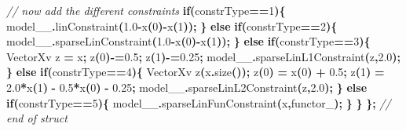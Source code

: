\documentclass[
]{book}
\newenvironment{Shaded}{\begin{snugshade}}{\end{snugshade}}
\newcommand{\CommentTok}[1]{\textcolor[rgb]{0.56,0.35,0.01}{\textit{#1}}}
\newcommand{\ControlFlowTok}[1]{\textcolor[rgb]{0.13,0.29,0.53}{\textbf{#1}}}
\newcommand{\DecValTok}[1]{\textcolor[rgb]{0.00,0.00,0.81}{#1}}
\newcommand{\FloatTok}[1]{\textcolor[rgb]{0.00,0.00,0.81}{#1}}
\newcommand{\NormalTok}[1]{#1}
\newcommand{\OperatorTok}[1]{\textcolor[rgb]{0.81,0.36,0.00}{\textbf{#1}}}
\newcommand{\VariableTok}[1]{\textcolor[rgb]{0.00,0.00,0.00}{#1}}
\begin{document}
\begin{Shaded}
\begin{Highlighting}[]
    \CommentTok{// now add the different constraints}
    \ControlFlowTok{if}\OperatorTok{(}\NormalTok{constrType}\OperatorTok{==}\DecValTok{1}\OperatorTok{)\{}
\NormalTok{      model\_\_}\OperatorTok{.}\NormalTok{linConstraint}\OperatorTok{(}\FloatTok{1.0}\OperatorTok{{-}}\NormalTok{x}\OperatorTok{(}\DecValTok{0}\OperatorTok{){-}}\NormalTok{x}\OperatorTok{(}\DecValTok{1}\OperatorTok{));}
    \OperatorTok{\}} \ControlFlowTok{else} \ControlFlowTok{if}\OperatorTok{(}\NormalTok{constrType}\OperatorTok{==}\DecValTok{2}\OperatorTok{)\{}
\NormalTok{      model\_\_}\OperatorTok{.}\NormalTok{sparseLinConstraint}\OperatorTok{(}\FloatTok{1.0}\OperatorTok{{-}}\NormalTok{x}\OperatorTok{(}\DecValTok{0}\OperatorTok{){-}}\NormalTok{x}\OperatorTok{(}\DecValTok{1}\OperatorTok{));}
    \OperatorTok{\}} \ControlFlowTok{else} \ControlFlowTok{if}\OperatorTok{(}\NormalTok{constrType}\OperatorTok{==}\DecValTok{3}\OperatorTok{)\{}
\NormalTok{      VectorXv z }\OperatorTok{=}\NormalTok{ x}\OperatorTok{;}
\NormalTok{      z}\OperatorTok{(}\DecValTok{0}\OperatorTok{){-}=}\FloatTok{0.5}\OperatorTok{;}
\NormalTok{      z}\OperatorTok{(}\DecValTok{1}\OperatorTok{){-}=}\FloatTok{0.25}\OperatorTok{;}
\NormalTok{      model\_\_}\OperatorTok{.}\NormalTok{sparseLinL1Constraint}\OperatorTok{(}\NormalTok{z}\OperatorTok{,}\FloatTok{2.0}\OperatorTok{);}
    \OperatorTok{\}} \ControlFlowTok{else} \ControlFlowTok{if}\OperatorTok{(}\NormalTok{constrType}\OperatorTok{==}\DecValTok{4}\OperatorTok{)\{}
\NormalTok{      VectorXv z}\OperatorTok{(}\NormalTok{x}\OperatorTok{.}\NormalTok{size}\OperatorTok{());}
\NormalTok{      z}\OperatorTok{(}\DecValTok{0}\OperatorTok{)} \OperatorTok{=}\NormalTok{ x}\OperatorTok{(}\DecValTok{0}\OperatorTok{)} \OperatorTok{+} \FloatTok{0.5}\OperatorTok{;}
\NormalTok{      z}\OperatorTok{(}\DecValTok{1}\OperatorTok{)} \OperatorTok{=} \FloatTok{2.0}\OperatorTok{*}\NormalTok{x}\OperatorTok{(}\DecValTok{1}\OperatorTok{)} \OperatorTok{{-}} \FloatTok{0.5}\OperatorTok{*}\NormalTok{x}\OperatorTok{(}\DecValTok{0}\OperatorTok{)} \OperatorTok{{-}} \FloatTok{0.25}\OperatorTok{;}
\NormalTok{      model\_\_}\OperatorTok{.}\NormalTok{sparseLinL2Constraint}\OperatorTok{(}\NormalTok{z}\OperatorTok{,}\FloatTok{2.0}\OperatorTok{);}
    \OperatorTok{\}} \ControlFlowTok{else} \ControlFlowTok{if}\OperatorTok{(}\NormalTok{constrType}\OperatorTok{==}\DecValTok{5}\OperatorTok{)\{}
\NormalTok{      model\_\_}\OperatorTok{.}\NormalTok{sparseLinFunConstraint}\OperatorTok{(}\NormalTok{x}\OperatorTok{,}\VariableTok{functor\_}\OperatorTok{);}
    \OperatorTok{\}}
  \OperatorTok{\}} 
\OperatorTok{\};} \CommentTok{// end of struct}
\end{Highlighting}
\end{Shaded}
\end{document}
